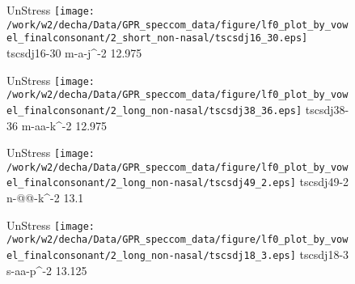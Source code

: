 \documentclass{article}
\begin{document}
\begin{figure}[t]
\begin{minipage}[b]{.24\textwidth}
UnStress
\centering
\texttt{[image: /work/w2/decha/Data/GPR\_speccom\_data/figure/lf0\_plot\_by\_vowel\_finalconsonant/2\_short\_non-nasal/tscsdj16\_30.eps]}
tscsdj16-30 m-a-j\textasciicircum-2 12.975
\end{minipage}
\begin{minipage}[b]{.24\textwidth}
UnStress
\centering
\texttt{[image: /work/w2/decha/Data/GPR\_speccom\_data/figure/lf0\_plot\_by\_vowel\_finalconsonant/2\_long\_non-nasal/tscsdj38\_36.eps]}
tscsdj38-36 m-aa-k\textasciicircum-2 12.975
\end{minipage}
\begin{minipage}[b]{.24\textwidth}
UnStress
\centering
\texttt{[image: /work/w2/decha/Data/GPR\_speccom\_data/figure/lf0\_plot\_by\_vowel\_finalconsonant/2\_long\_non-nasal/tscsdj49\_2.eps]}
tscsdj49-2 n-@@-k\textasciicircum-2 13.1
\end{minipage}
\begin{minipage}[b]{.24\textwidth}
UnStress
\centering
\texttt{[image: /work/w2/decha/Data/GPR\_speccom\_data/figure/lf0\_plot\_by\_vowel\_finalconsonant/2\_long\_non-nasal/tscsdj18\_3.eps]}
tscsdj18-3 s-aa-p\textasciicircum-2 13.125
\end{minipage}
\end{figure}
\end{document}
